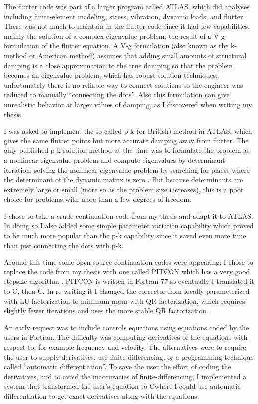 \documentclass[11pt,openany,twoside]{book}
\numberwithin{equation}{section}		%
\def\Cpp{{C\nolinebreak[4]\hspace{-.05em}\raisebox{.4ex}{\tiny\bf ++}}\:}
\begin{document}
The flutter code was part of a larger program called ATLAS, which did
analyses including finite-element modeling, stress, vibration, dynamic loads,
and flutter. There was not much to maintain in the flutter code since it
had few capabilities, mainly the solution of a complex eigenvalue problem,
the result of a V-g formulation of the flutter equation.
A V-g formulation (also known as the k-method or American method) assumes that
adding small amounts of structural damping is a close approximation to the true damping so that the
problem becomes an eigenvalue problem, which has robust solution techniques;
unfortunately there is no reliable way to connect solutions so the
engineer was reduced to manually ``connecting the dots''. Also this formulation can
give unrealistic behavior at larger values of damping, as I discovered when writing
my thesis.

I was asked to implement the so-called p-k (or British) method in ATLAS, which
gives the same flutter points but more accurate damping away from flutter.
The only published p-k solution method at the time was to formulate
the problem as a nonlinear eigenvalue problem and compute eigenvalues
by determinant iteration:
solving the nonlinear eigenvalue problem by searching for places where
the determinant of the dynamic matrix is zero \cite{hassig1971approximate}.
But because determinants are extremely large or small (more so as the
problem size increases), this is a poor choice for problems with more
than a few degrees of freedom.

I chose to take a crude continuation code from my thesis
\cite{meyer1982aeroelastic} and adapt
it to ATLAS. In doing so I also added some simple parameter variation capability
which proved to be much more popular than the p-k capability since
it saved even more time than just connecting the dots with p-k.

Around this time some open-source continuation codes were appearing;
I chose to replace the code from my thesis with one called PITCON
which has a very good stepsize algorithm \cite{rheinboldt1983algorithm}.
PITCON is written in Fortran 77 so eventually I translated it to C, then
\Cpp. In re-writing it I changed the corrector from locally-parameterized
with LU factorization to minimum-norm with QR factorization, which requires
slightly fewer iterations and uses the more stable QR factorization.

An early request was to include controls equations using equations
coded by the users in Fortran. The difficulty was computing derivatives
of the equations with respect to, for example frequency and velocity.
The alternatives were to require the user to supply derivatives, use
finite-differencing, or a programming technique called
``automatic differentiation''.
To save the user the effort of coding the derivatives, and to
avoid the inaccuracies of finite-differencing, I implemented a system
that transformed the user's equation to \Cpp where I could use automatic
differentiation to get exact derivatives along with the equations.
\end{document}
